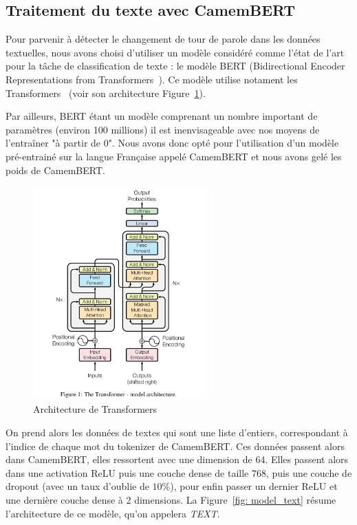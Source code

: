 \subsection{Traitement du texte avec CamemBERT}

Pour parvenir à détecter le changement de tour de parole dans les données textuelles, nous avons choisi d'utiliser un modèle
considéré comme l'état de l'art pour la tâche de classification de texte : le modèle BERT (Bidirectional Encoder
Representations from Transformers~\cite{Bert}). Ce modèle utilise notament les Transformers~\cite{transformers} 
(voir son architecture Figure~\ref{fig: Transformers}).

Par ailleurs, BERT étant un modèle comprenant un nombre important de paramètres (environ 100 millions) il est inenvisageable avec
nos moyens de l'entraîner "à partir de 0". Nous avons donc opté pour l'utilisation d'un modèle pré-entrainé sur la langue Française
appelé CamemBERT et nous avons gelé les poids de CamemBERT.

\begin{figure}[H]
    \centering
    \includegraphics[width=0.6\textwidth]{image_model/model_transformers.png}
    \caption{Architecture de Transformers}
    \label{fig: Transformers} 
\end{figure}



On prend alors les données de textes qui sont une liste d'entiers, correspondant 
à l'indice de chaque mot du tokenizer de CamemBERT. Ces données passent alors dans CamemBERT, elles ressortent avec une dimension de
64. Elles passent alors dans une activation ReLU puis une couche dense de taille 768, puis une couche de dropout (avec un taux
d'oublie de $10\%$), pour enfin passer un dernier ReLU et une dernière couche dense à 2 dimensions. 
La Figure~\ref{fig: model_text} résume l'architecture de ce modèle, qu'on appelera \textit{TEXT}.

